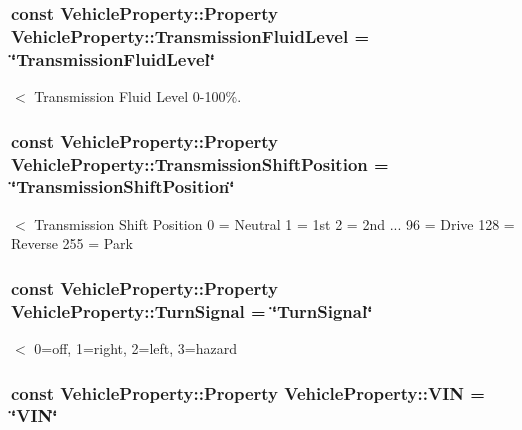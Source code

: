 \hypertarget{classVehicleProperty_a288aa5c2be698825142da9d87c13c447}{
\subsubsection[{Transmission\-Fluid\-Level}]{\setlength{\rightskip}{0pt plus 5cm}const Vehicle\-Property\-::\-Property Vehicle\-Property\-::\-Transmission\-Fluid\-Level = \char`\"{}Transmission\-Fluid\-Level\char`\"{}\hspace{0.3cm}{\ttfamily [static]}}}\label{classVehicleProperty_a288aa5c2be698825142da9d87c13c447}
$<$ Transmission Fluid Level 0-\/100\%. \hypertarget{classVehicleProperty_ae486d9ea26918460822086b797018800}{
\subsubsection[{Transmission\-Shift\-Position}]{\setlength{\rightskip}{0pt plus 5cm}const Vehicle\-Property\-::\-Property Vehicle\-Property\-::\-Transmission\-Shift\-Position = \char`\"{}Transmission\-Shift\-Position\char`\"{}\hspace{0.3cm}{\ttfamily [static]}}}\label{classVehicleProperty_ae486d9ea26918460822086b797018800}
$<$ Transmission Shift Position 0 = Neutral 1 = 1st 2 = 2nd ... 96 = Drive 128 = Reverse 255 = Park \hypertarget{classVehicleProperty_a0aae609c370a46a92dc52a31d2cc0310}{
\subsubsection[{Turn\-Signal}]{\setlength{\rightskip}{0pt plus 5cm}const Vehicle\-Property\-::\-Property Vehicle\-Property\-::\-Turn\-Signal = \char`\"{}Turn\-Signal\char`\"{}\hspace{0.3cm}{\ttfamily [static]}}}\label{classVehicleProperty_a0aae609c370a46a92dc52a31d2cc0310}
$<$ 0=off, 1=right, 2=left, 3=hazard \hypertarget{classVehicleProperty_ae72c1c7de185f330862c62dfb9d93a34}{
\subsubsection[{V\-I\-N}]{\setlength{\rightskip}{0pt plus 5cm}const Vehicle\-Property\-::\-Property Vehicle\-Property\-::\-V\-I\-N = \char`\"{}V\-I\-N\char`\"{}\hspace{0.3cm}{\ttfamily [static]}}}\label{classVehicleProperty_ae72c1c7de185f330862c62dfb9d93a34}
